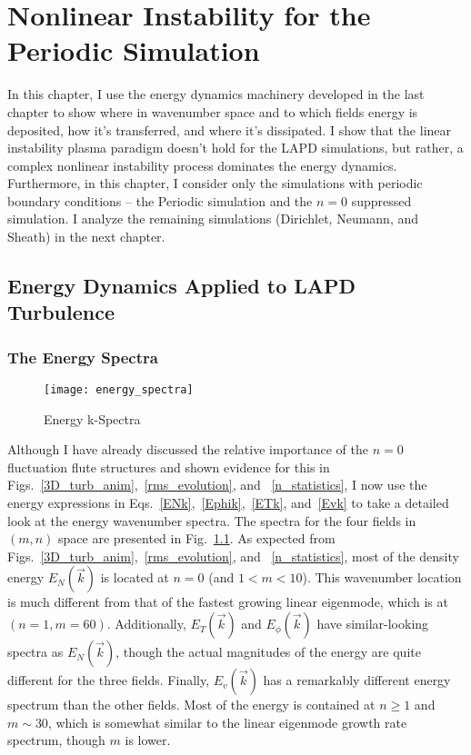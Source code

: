 \chapter{Nonlinear Instability for the Periodic Simulation}
\label{c_nlin_periodic}

In this chapter, I use the energy dynamics machinery developed in the last chapter to show where in wavenumber space and to which fields energy is deposited, how it's transferred,
and where it's dissipated. I show that the linear instability plasma paradigm doesn't hold for the LAPD simulations, but rather, a complex nonlinear instability process dominates
the energy dynamics.
Furthermore, in this chapter, I consider only the simulations with periodic boundary conditions -- the Periodic simulation and the $n=0$ suppressed simulation. I analyze the remaining simulations
(Dirichlet, Neumann, and Sheath) in the next chapter.

\section{Energy Dynamics Applied to LAPD Turbulence}

\subsection{The Energy Spectra}
\label{ss_en_spec}

\begin{figure}
\centerline{\texttt{[image: energy\_spectra]}}
\caption{Energy k-Spectra}
\label{energy_spectra}
\end{figure}

Although I have already discussed the relative importance of the $n=0$ fluctuation flute structures and shown evidence for this in Figs.~\ref{3D_turb_anim},~\ref{rms_evolution}, and
~\ref{n_statistics}, I now use the energy expressions in Eqs.~\ref{ENk},~\ref{Ephik},~\ref{ETk}, and~\ref{Evk} to take a detailed look at the energy
wavenumber spectra. The spectra for the four fields in $(m,n)$ space are presented in Fig.~\ref{energy_spectra}. As expected from Figs.~\ref{3D_turb_anim},~\ref{rms_evolution}, and
~\ref{n_statistics}, most of the density energy $E_N(\vec{k})$ is located at $n=0$ (and $1 < m < 10$). This wavenumber location is much different from 
that of the fastest growing linear eigenmode, which is at $(n = 1, m = 60)$. Additionally, $E_T(\vec{k})$ and $E_\phi(\vec{k})$ have similar-looking spectra as $E_N(\vec{k})$, though
the actual magnitudes of the energy are quite different for the three fields. Finally, $E_v(\vec{k})$ has a remarkably different energy spectrum than the other fields. Most of
the energy is contained at $n \ge 1$ and $m \sim 30$, which is somewhat similar to the linear eigenmode growth rate spectrum, though $m$ is lower.

